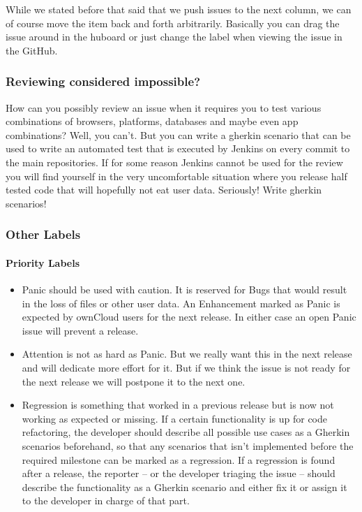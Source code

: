 \documentclass[letterpaper,10pt,english]{sphinxmanual}
\begin{document}
While we stated before that said that we push issues to the next column, we can
of course move the item back and forth arbitrarily. Basically you can drag the
issue around in the huboard or just change the label when viewing the issue in
the GitHub.


\subsubsection{Reviewing considered impossible?}
\label{bugtracker/kanban:reviewing-considered-impossible}
How can you possibly review an issue when it requires you to test various
combinations of browsers, platforms, databases and maybe even app combinations?
Well, you can’t. But you can write a gherkin scenario that can be used to write
an automated test that is executed by Jenkins on every commit to the main
repositories. If for some reason Jenkins cannot be used for the review you will
find yourself in the very uncomfortable situation where you release half tested
code that will hopefully not eat user data. Seriously! Write gherkin scenarios!


\subsubsection{Other Labels}
\label{bugtracker/kanban:other-labels}

\paragraph{Priority Labels}
\label{bugtracker/kanban:priority-labels}\begin{itemize}
\item {} 
Panic should be used with caution. It is reserved for Bugs that would result
in the loss of files or other user data. An Enhancement marked as Panic is
expected by ownCloud users for the next release. In either case an open Panic
issue will prevent a release.

\item {} 
Attention is not as hard as Panic. But we really want this in the next release
and will dedicate more effort for it. But if we think the issue is not ready
for the next release we will postpone it to the next one.

\item {} 
Regression is something that worked in a previous release but is now not
working as expected or missing. If a certain functionality is up for code
refactoring, the developer should describe all possible use cases as a Gherkin
scenarios beforehand, so that any scenarios that isn’t implemented before the
required milestone can be marked as a regression. If a regression is found
after a release, the reporter – or the developer triaging the issue – should
describe the functionality as a Gherkin scenario and either fix it or assign
it to the developer in charge of that part.

\end{itemize}
\end{document}
